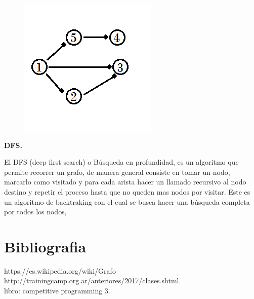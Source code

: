 \documentclass[12pt, a4paper]{article}
\newcommand\cppfile[2][]{

}
\newcommand{\subtitulo}[1]{\begin{center}\textbf{#1}\end{center}}
\begin{document}
	\begin{figure}[!htb]
			\centering
			\includegraphics[scale=1]{imagenes/grafo_ejemplo_lista_ady}
			\caption{}%
		\endminipage
			\centering
			\cppfile[6-14]{codigos/DFS.cpp}
		\endminipage
	\end{figure}	
	
	\subtitulo{DFS.}
	
	El DFS (deep first search) o Búsqueda en profundidad, es un algoritmo que permite recorrer un grafo, de manera
	general consiste en tomar un nodo, marcarlo como visitado y para cada arista hacer un llamado recursivo al nodo
	destino y repetir el proceso hasta que no queden mas nodos por visitar. Este es un algoritmo de backtraking con
	el cual se busca hacer una búsqueda completa por todos los nodos, 
	
	\section{Bibliografia}
	https://es.wikipedia.org/wiki/Grafo\\
	http://trainingcamp.org.ar/anteriores/2017/clases.shtml.\\ 
	libro: competitive programming 3.\\ 
\end{document}

